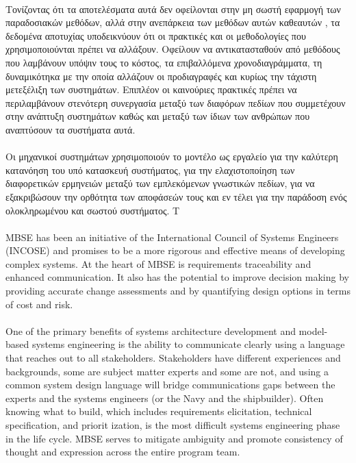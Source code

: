 \documentclass[a4paper,12pt,twoside]{report}
\begin{document}
			\paragraph{} {Τονίζοντας ότι τα αποτελέσματα αυτά δεν οφείλονται στην μη σωστή εφαρμογή των παραδοσιακών μεθόδων, αλλά στην ανεπάρκεια των μεθόδων αυτών καθεαυτών \cite{MDSysDevelIBM}, τα δεδομένα αποτυχίας υποδεικνύουν ότι οι πρακτικές και οι μεθοδολογίες που χρησιμοποιούνται πρέπει να αλλάξουν. Οφείλουν να αντικατασταθούν από μεθόδους που λαμβάνουν υπόψιν τους το κόστος, τα επιβαλλόμενα χρονοδιαγράμματα, τη δυναμικότηκα με την οποία αλλάζουν οι προδιαγραφές και κυρίως την τάχιστη μετεξέλιξη των συστημάτων. Επιπλέον οι καινούριες πρακτικές πρέπει να περιλαμβάνουν στενότερη συνεργασία μεταξύ των διαφόρων πεδίων που συμμετέχουν στην ανάπτυξη συστημάτων καθώς και μεταξύ των ίδιων των ανθρώπων που αναπτύσουν τα συστήματα αυτά. 
			}
			
			\paragraph{} {Οι μηχανικοί συστημάτων χρησιμοποιούν το μοντέλο ως εργαλείο για την καλύτερη κατανόηση του υπό κατασκευή συστήματος, για την ελαχιστοποίηση των διαφορετικών ερμηνειών μεταξύ των εμπλεκόμενων γνωστικών πεδίων, για να εξακριβώσουν την ορθότητα των αποφάσεών τους και εν τέλει για την παράδοση ενός ολοκληρωμένου και σωστού συστήματος. Τ
			}
			
			\paragraph{} {MBSE has been an initiative of the International Council of Systems Engineers (INCOSE) and promises to be a more rigorous and effective means of developing complex systems. At the heart of MBSE is requirements traceability and enhanced communication. It also has the potential to improve decision making by providing accurate change assessments and by quantifying design options in terms of cost and risk. \cite{MBSESystemArchitectureNavalShipDesign}
			}
			
			\paragraph{} {One of the primary benefits of systems architecture development and model-based systems engineering is the ability to communicate clearly using a language that reaches out to all stakeholders. Stakeholders have different experiences and backgrounds, some are subject matter experts and some are not, and using a common system design language will bridge communications gaps between the experts and the systems engineers (or the Navy and the shipbuilder). Often knowing what to build, which includes requirements elicitation, technical specification, and priorit ization, is the most difficult systems engineering phase in the life cycle. MBSE serves to mitigate ambiguity and promote consistency of thought and expression across the entire program team. \cite{MBSESystemArchitectureNavalShipDesign}
			}
									
\end{document}
